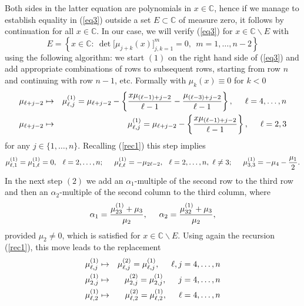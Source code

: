 \documentclass[10pt,oneside,reqno]{amsart}
\numberwithin{equation}{section}
\def\eqref#1{(\ref{#1})}
\begin{document}
Both sides in the latter equation are polynomials in $x\in\mathbb{C}$, hence if we manage to establish equality in \eqref{eq3} outside a set $E\subset\mathbb{C}$ of 
measure zero, it follows by continuation for all $x\in\mathbb{C}$. In our case, we will verify \eqref{eq3} for $x\in\mathbb{C}\backslash E$ with
\begin{equation*}
  E=\left\{x\in\mathbb{C}:\ \det\Big[\mu_{j+k}(x)\Big]_{j,k=1}^m=0,\ \ m=1,\ldots,n-2\right\}
\end{equation*}
using the following algorithm: we start $(1)$ on the right hand side of \eqref{eq3} and add appropriate combinations of rows to subsequent rows, starting from row $n$ and continuing with row $n-1$, etc. Formally 
with $\mu_k(x)\equiv 0$ for $k<0$
\begin{eqnarray*}
  \mu_{\ell+j-2}&\mapsto& \mu^{(1)}_{\ell,j} = \mu_{\ell+j-2}-\left\{\frac{x\mu_{(\ell-1)+j-2}}{\ell-1}-\frac{\mu_{(\ell-3)+j-2}}{\ell-1}\right\},\hspace{0.5cm}\ell=4,\ldots,n\\
  \mu_{\ell+j-2}&\mapsto& \mu^{(1)}_{\ell,j} = \mu_{\ell+j-2}-\left\{\frac{x\mu_{(\ell-1)+j-2}}{\ell-1}\right\},\hspace{0.5cm}\ell=2,3
\end{eqnarray*}
for any $j\in\{1,\ldots,n\}$. Recalling \eqref{rec1} this step implies
\begin{equation*}
  \mu^{(1)}_{\ell,1}= \mu^{(1)}_{1,\ell}=0,\hspace{0.25cm} \ell=2,\ldots,n;\hspace{0.5cm}\mu^{(1)}_{\ell,\ell}= -\mu_{2\ell-2},
  \hspace{0.25cm}\ell=2,\ldots,n,\ \ell\neq 3;\hspace{0.5cm}\mu^{(1)}_{3,3}=-\mu_4-\frac{\mu_1}{2}.
\end{equation*}
In the next step $(2)$ we add an $\alpha_1$-multiple of the second row to the third row and then an $\alpha_2$-multiple of the second column to the third column, where
\begin{equation*}
  \alpha_1 = \frac{\mu^{(1)}_{23}+\mu_3}{\mu_2},\hspace{0.5cm}\alpha_2 = \frac{\mu^{(1)}_{32}+\mu_3}{\mu_2},
\end{equation*}
provided $\mu_2\neq 0$, which is satisfied for $x\in\mathbb{C}\backslash E$. Using again the recursion \eqref{rec1}, this move leads to the replacement
\begin{eqnarray*}
  \mu^{(1)}_{\ell,j}&\mapsto& \mu^{(2)}_{\ell,j} = \mu^{(1)}_{\ell,j},\hspace{0.5cm}\ell,j= 4,\ldots,n\\
  \mu^{(1)}_{2,j}&\mapsto& \mu^{(2)}_{2,j} = \mu^{(1)}_{2,j},\hspace{0.5cm}j=4,\ldots,n\\
  \mu^{(1)}_{\ell,2}&\mapsto& \mu^{(2)}_{\ell,2} = \mu^{(1)}_{\ell,2},\hspace{0.5cm}\ell=4,\ldots,n
\end{eqnarray*}
\end{document}
